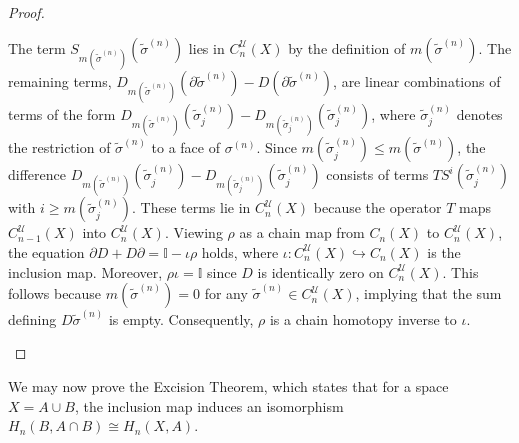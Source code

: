 \begin{proof}
\begin{enumerate}
	The term \( S_{m(\tilde{\sigma}^{(n)})}(\tilde{\sigma}^{(n)}) \) lies in \( C_n^{\mathcal{U}}(X) \) by the definition of \( m(\tilde{\sigma}^{(n)}) \). The remaining terms, \( D_{m(\tilde{\sigma}^{(n)})}(\partial \tilde{\sigma}^{(n)}) - D(\partial \tilde{\sigma}^{(n)}) \), are linear combinations of terms of the form \( D_{m(\tilde{\sigma}^{(n)})}(\tilde{\sigma}^{(n)}_j) - D_{m(\tilde{\sigma}^{(n)}_j)}(\tilde{\sigma}^{(n)}_j) \), where \( \tilde{\sigma}^{(n)}_j \) denotes the restriction of \( \tilde{\sigma}^{(n)} \) to a face of \( \sigma^{(n)} \). Since \( m(\tilde{\sigma}^{(n)}_j) \leq m(\tilde{\sigma}^{(n)}) \), the difference \( D_{m(\tilde{\sigma}^{(n)})}(\tilde{\sigma}^{(n)}_j) - D_{m(\tilde{\sigma}^{(n)}_j)}(\tilde{\sigma}^{(n)}_j) \) consists of terms \( T S^i(\tilde{\sigma}^{(n)}_j) \) with \( i \geq m(\tilde{\sigma}^{(n)}_j) \). These terms lie in \( C_n^{\mathcal{U}}(X) \) because the operator \( T \) maps \( C_{n-1}^{\mathcal{U}}(X) \) into \( C_n^{\mathcal{U}}(X) \). Viewing \( \rho \) as a chain map from \( C_n(X) \) to \( C_n^{\mathcal{U}}(X) \), the equation $\partial D + D \partial = \mathbb{I} - \iota \rho$ holds, where \( \iota : C_n^{\mathcal{U}}(X) \hookrightarrow C_n(X) \) is the inclusion map. Moreover, \( \rho \iota = \mathbb{I} \) since \( D \) is identically zero on \( C_n^{\mathcal{U}}(X) \). This follows because \( m(\tilde{\sigma}^{(n)}) = 0 \) for any \( \tilde{\sigma}^{(n)} \in C_n^{\mathcal{U}}(X) \), implying that the sum defining \( D\tilde{\sigma}^{(n)} \) is empty. Consequently, \( \rho \) is a chain homotopy inverse to \( \iota \).
\end{enumerate}
\end{proof}

We may now prove the Excision Theorem, which states that for a space \( X = A \cup B \), the inclusion map induces an isomorphism \( H_n(B, A \cap B) \cong H_n(X, A) \).

